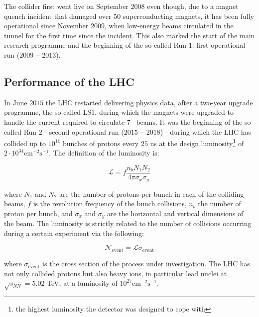 		The collider first went live on September 2008 even though, due to a magnet quench incident that damaged over $50$ superconducting magnets, it has been fully operational since November $2009$, when low-energy beams circulated in the tunnel for the first time since the incident. This also marked the start of the main research programme and the beginning of the so-called Run 1: first operational run ($2009 - 2013$).


		\subsection*{Performance of the LHC}

			In June $2015$ the \ac{LHC} restarted delivering physics data, after a two-year upgrade programme, the so-called \ac{LS1}, during which the magnets were upgraded to handle the current required to circulate $7$-\TeV\ beams. It was the beginning of the so-called Run 2 - second operational run ($2015-2018$) - during which the \ac{LHC} has collided up to $10^{11}$ bunches of protons every $25$ ns at the design luminosity\footnote{the highest luminosity the detector was designed to cope with} of $2 \cdot 10^{34} \mathrm{cm}^{-2}\mathrm{s}^{-1}$. The definition of the luminosity is:

			\begin{equation}
				{\mathcal L} = f \frac{n_b N_1 N_2}{4 \pi \sigma_x \sigma_y}
			\label{eq:lumi}
			\end{equation}

			\noindent where $N_1$ and $N_2$ are the number of protons per bunch in each of the colliding beams, $f$ is the revolution frequency of the bunch collisions, $n_b$ the number of proton per bunch, and $\sigma_x$ and $\sigma_y$ are the horizontal and vertical dimensions of the beam. The luminosity is strictly related to the number of collisions occurring during a certain experiment via the following: 

			\begin{equation}
					{\mathcal N}_{\mathrm{event}} = {\mathcal L} \sigma_{\mathrm{event}}
			\label{eq:lumiEvt}
			\end{equation}

			\noindent where $\sigma_{\mathrm{event}}$ is the cross section of the process under investigation. The \acs{LHC} has not only collided protons but also heavy ions, in particular lead nuclei at $\sqrt{s_{NN}} = 5.02$ TeV, at a luminosity of $10^{27} \mathrm{cm}^{-2} \mathrm{s}^{-1}$\cite{HI2015}.



